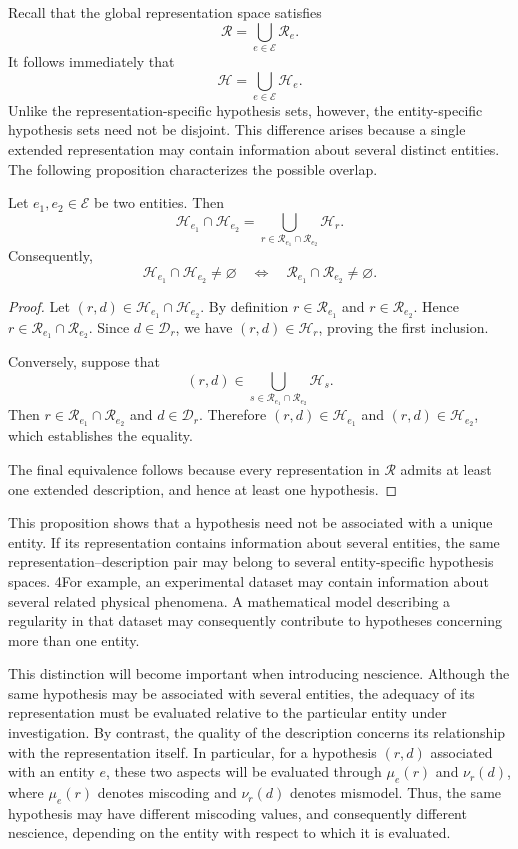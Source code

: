 Recall that the global representation space satisfies
\[
\mathcal{R} = \bigcup_{e\in\mathcal{E}}\mathcal{R}_e.
\]
It follows immediately that
\[
\mathcal{H} = \bigcup_{e\in\mathcal{E}}\mathcal{H}_e.
\]
Unlike the representation-specific hypothesis sets, however, the entity-specific hypothesis sets need not be disjoint. This difference arises because a single extended representation may contain information about several distinct entities. The following proposition characterizes the possible overlap.

\begin{proposition}
\label{prop:hypothesis_entity_intersection}
Let $e_1,e_2\in\mathcal{E}$ be two entities. Then
\[
\mathcal{H}_{e_1}\cap\mathcal{H}_{e_2} = 
\bigcup_{r\in\mathcal{R}_{e_1}\cap\mathcal{R}_{e_2}} \mathcal{H}_r.
\]
Consequently,
\[
\mathcal{H}_{e_1}\cap\mathcal{H}_{e_2} \neq\varnothing \quad\Longleftrightarrow\quad
\mathcal{R}_{e_1}\cap\mathcal{R}_{e_2} \neq\varnothing.
\]
\end{proposition}
\begin{proof}
Let $(r,d)\in\mathcal{H}_{e_1}\cap\mathcal{H}_{e_2}$. By definition $r\in\mathcal{R}_{e_1}$ and $r\in\mathcal{R}_{e_2}$. Hence $r\in\mathcal{R}_{e_1}\cap\mathcal{R}_{e_2}$. Since $d\in\mathcal{D}_r$, we have $(r,d)\in\mathcal{H}_r$, proving the first inclusion.

Conversely, suppose that
\[
(r,d) \in \bigcup_{s\in\mathcal{R}_{e_1}\cap\mathcal{R}_{e_2}} \mathcal{H}_s.
\]
Then $r\in\mathcal{R}_{e_1}\cap\mathcal{R}_{e_2}$ and $d\in\mathcal{D}_r$. Therefore $(r,d)\in\mathcal{H}_{e_1}$ and $(r,d)\in\mathcal{H}_{e_2}$, which establishes the equality.

The final equivalence follows because every representation in $\mathcal{R}$ admits at least one extended description, and hence at least one hypothesis.
\end{proof}

This proposition shows that a hypothesis need not be associated with a unique entity. If its representation contains information about several entities, the same representation--description pair may belong to several entity-specific hypothesis spaces. 4For example, an experimental dataset may contain information about several related physical phenomena. A mathematical model describing a regularity in that dataset may consequently contribute to hypotheses concerning more than one entity.

This distinction will become important when introducing nescience. Although the same hypothesis may be associated with several entities, the adequacy of its representation must be evaluated relative to the particular entity under investigation. By contrast, the quality of the description concerns its relationship with the representation itself. In particular, for a hypothesis $(r,d)$ associated with an entity $e$, these two aspects will be evaluated through $\mu_e(r)$ and $\nu_r(d)$, where $\mu_e(r)$ denotes miscoding and $\nu_r(d)$ denotes mismodel. Thus, the same hypothesis may have different miscoding values, and consequently different nescience, depending on the entity with respect to which it is evaluated.

